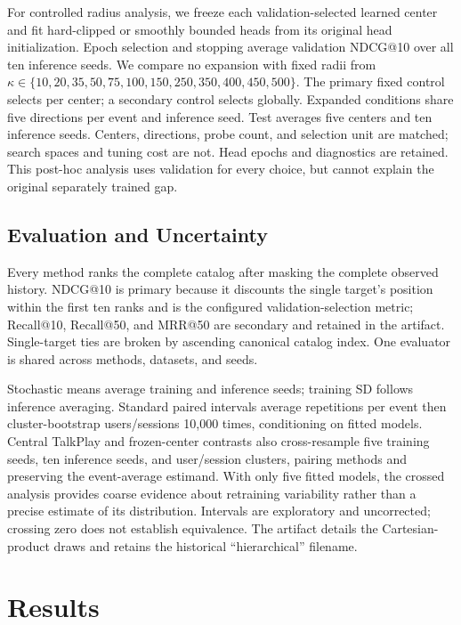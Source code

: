 \documentclass[runningheads]{llncs}
\begin{document}
For controlled radius analysis, we freeze each validation-selected learned
center and fit hard-clipped or smoothly bounded heads from its original head
initialization. Epoch selection and stopping average validation NDCG@10 over
all ten inference seeds. We compare no expansion with fixed radii from
$\kappa\in\{10,20,35,50,75,100,150,250,350,400,450,500\}$.
The primary fixed control selects per center; a secondary control selects
globally. Expanded conditions share five directions per event and inference
seed. Test averages five centers and ten inference seeds. Centers, directions,
probe count, and selection unit are matched; search spaces and tuning cost are
not. Head epochs and diagnostics are retained. This post-hoc analysis uses
validation for every choice, but cannot explain the original separately
trained gap.

\subsection{Evaluation and Uncertainty}

Every method ranks the complete catalog after masking the complete observed
history. NDCG@10 is primary because it discounts the single target's position
within the first ten ranks and is the configured validation-selection metric;
Recall@10, Recall@50, and MRR@50 are secondary and retained in the artifact.
Single-target ties are broken by ascending canonical catalog index. One
evaluator is shared across methods, datasets, and seeds.

Stochastic means average training and inference seeds; training SD follows
inference averaging. Standard paired intervals average repetitions per event
then cluster-bootstrap users/sessions 10,000 times, conditioning on fitted
models. Central TalkPlay and frozen-center contrasts also cross-resample five
training seeds, ten inference seeds, and user/session clusters, pairing methods
and preserving the event-average estimand. With only five fitted models, the
crossed analysis provides coarse evidence about retraining variability rather
than a precise estimate of its distribution. Intervals are exploratory and
uncorrected; crossing zero does not establish equivalence. The artifact details
the Cartesian-product
draws and retains the historical ``hierarchical'' filename.

\section{Results}
\label{sec:results}
\end{document}
